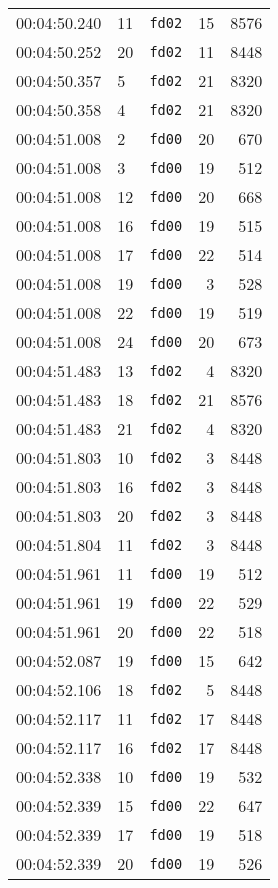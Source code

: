 \documentclass{article}
\begin{document}
\begin{longtable}{lllrr}
00:04:50.240 & 11 & \texttt{fd02} & 15 & 8576 \\
00:04:50.252 & 20 & \texttt{fd02} & 11 & 8448 \\
00:04:50.357 & 5 & \texttt{fd02} & 21 & 8320 \\
00:04:50.358 & 4 & \texttt{fd02} & 21 & 8320 \\
00:04:51.008 & 2 & \texttt{fd00} & 20 & 670 \\
00:04:51.008 & 3 & \texttt{fd00} & 19 & 512 \\
00:04:51.008 & 12 & \texttt{fd00} & 20 & 668 \\
00:04:51.008 & 16 & \texttt{fd00} & 19 & 515 \\
00:04:51.008 & 17 & \texttt{fd00} & 22 & 514 \\
00:04:51.008 & 19 & \texttt{fd00} & 3 & 528 \\
00:04:51.008 & 22 & \texttt{fd00} & 19 & 519 \\
00:04:51.008 & 24 & \texttt{fd00} & 20 & 673 \\
00:04:51.483 & 13 & \texttt{fd02} & 4 & 8320 \\
00:04:51.483 & 18 & \texttt{fd02} & 21 & 8576 \\
00:04:51.483 & 21 & \texttt{fd02} & 4 & 8320 \\
00:04:51.803 & 10 & \texttt{fd02} & 3 & 8448 \\
00:04:51.803 & 16 & \texttt{fd02} & 3 & 8448 \\
00:04:51.803 & 20 & \texttt{fd02} & 3 & 8448 \\
00:04:51.804 & 11 & \texttt{fd02} & 3 & 8448 \\
00:04:51.961 & 11 & \texttt{fd00} & 19 & 512 \\
00:04:51.961 & 19 & \texttt{fd00} & 22 & 529 \\
00:04:51.961 & 20 & \texttt{fd00} & 22 & 518 \\
00:04:52.087 & 19 & \texttt{fd00} & 15 & 642 \\
00:04:52.106 & 18 & \texttt{fd02} & 5 & 8448 \\
00:04:52.117 & 11 & \texttt{fd02} & 17 & 8448 \\
00:04:52.117 & 16 & \texttt{fd02} & 17 & 8448 \\
00:04:52.338 & 10 & \texttt{fd00} & 19 & 532 \\
00:04:52.339 & 15 & \texttt{fd00} & 22 & 647 \\
00:04:52.339 & 17 & \texttt{fd00} & 19 & 518 \\
00:04:52.339 & 20 & \texttt{fd00} & 19 & 526 \\

\end{longtable}
\end{document}
